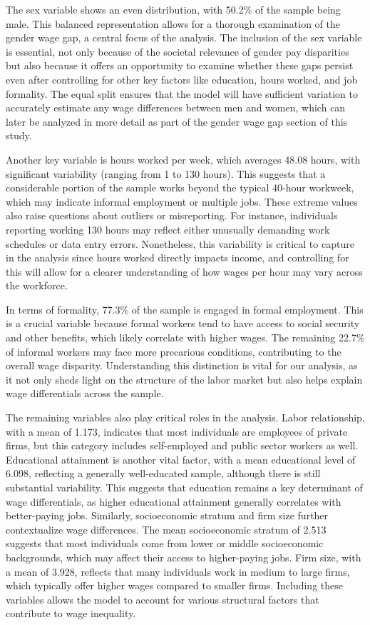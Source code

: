 \documentclass[11pt,a4paper,onecolumn]{article}
\begin{document}
    The sex variable shows an even distribution, with 50.2\% of the sample being male. This balanced representation allows for a thorough examination of the gender wage gap, a central focus of the analysis. The inclusion of the sex variable is essential, not only because of the societal relevance of gender pay disparities but also because it offers an opportunity to examine whether these gaps persist even after controlling for other key factors like education, hours worked, and job formality. The equal split ensures that the model will have sufficient variation to accurately estimate any wage differences between men and women, which can later be analyzed in more detail as part of the gender wage gap section of this study.
    
    Another key variable is hours worked per week, which averages 48.08 hours, with significant variability (ranging from 1 to 130 hours). This suggests that a considerable portion of the sample works beyond the typical 40-hour workweek, which may indicate informal employment or multiple jobs. These extreme values also raise questions about outliers or misreporting. For instance, individuals reporting working 130 hours may reflect either unusually demanding work schedules or data entry errors. Nonetheless, this variability is critical to capture in the analysis since hours worked directly impacts income, and controlling for this will allow for a clearer understanding of how wages per hour may vary across the workforce.
    
    In terms of formality, 77.3\% of the sample is engaged in formal employment. This is a crucial variable because formal workers tend to have access to social security and other benefits, which likely correlate with higher wages. The remaining 22.7\% of informal workers may face more precarious conditions, contributing to the overall wage disparity. Understanding this distinction is vital for our analysis, as it not only sheds light on the structure of the labor market but also helps explain wage differentials across the sample.
    
    The remaining variables also play critical roles in the analysis. Labor relationship, with a mean of 1.173, indicates that most individuals are employees of private firms, but this category includes self-employed and public sector workers as well. Educational attainment is another vital factor, with a mean educational level of 6.098, reflecting a generally well-educated sample, although there is still substantial variability. This suggests that education remains a key determinant of wage differentials, as higher educational attainment generally correlates with better-paying jobs. Similarly, socioeconomic stratum and firm size further contextualize wage differences. The mean socioeconomic stratum of 2.513 suggests that most individuals come from lower or middle socioeconomic backgrounds, which may affect their access to higher-paying jobs. Firm size, with a mean of 3.928, reflects that many individuals work in medium to large firms, which typically offer higher wages compared to smaller firms. Including these variables allows the model to account for various structural factors that contribute to wage inequality.
\end{document}

